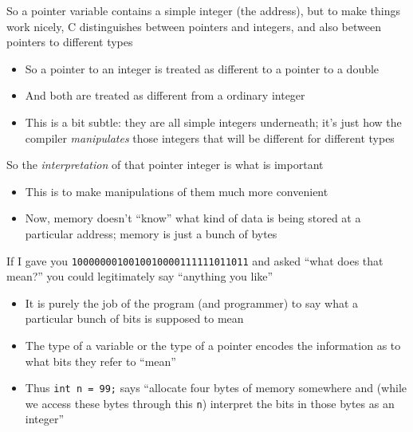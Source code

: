 \documentclass{beamer}
\def\code#1{{\ifmmode\else\large\fi\tt#1}}
\begin{document}
\begin{frame}
So a pointer variable contains a simple integer (the address), but to make
things work nicely, C distinguishes between pointers and integers, and also
between pointers to different types
\begin{itemize}
\item{So a pointer to an integer is treated as different to a pointer to
  a double}

\item{And both are treated as different from a ordinary integer}

\item{This is a bit subtle: they are all simple integers underneath;
  it's just how the compiler {\em manipulates\/} those integers that will be
  different for different types}
\end{itemize}
\end{frame}

\begin{frame}
So the {\em interpretation\/} of that pointer integer is what is important
\begin{itemize}
\item{This is to make manipulations of them much more convenient}

\item{Now, memory doesn't ``know'' what kind of data is being
  stored at a particular address; memory is just a bunch of bytes}
\end{itemize}
\end{frame}

\begin{frame}
If I gave you \code{1000000010010010000111111011011} and asked
  ``what does that mean?'' you could legitimately say ``anything you like''
\begin{itemize}
\item{It is purely the job of the program (and programmer) to
say what a particular bunch of bits is supposed to mean}

\item{The type of a variable or the type of a pointer encodes the
  information as to what bits they refer to ``mean''}

\item{Thus \code{int n = 99;} says ``allocate four bytes of memory
  somewhere and (while we access these bytes through this \code{n})
  interpret the bits in those bytes as an integer''}
\end{itemize}
\end{frame}
\end{document}
